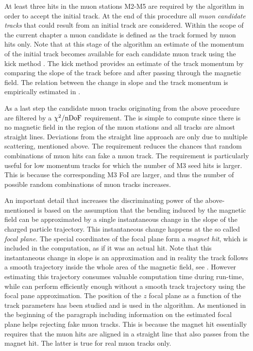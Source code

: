 At least three hits in the muon stations M2-M5 are required by the \mvm algorithm in order to accept the initial \velo track.
At the end of this procedure all {\it muon candidate tracks} that could result from an initial \velo track are considered.
Within the scope of the current chapter a muon candidate is defined as the track formed by muon hits only.
Note that at this stage of the algorithm an estimate of the momentum of the initial \velo track becomes available
for each candidate muon track using the kick method \cite{Hommels:999327}. The kick method provides an estimate
of the track momentum by comparing the slope of the track before and after passing through the \lhcb magnetic
field. The relation between the change in slope and the track momentum is empirically estimated in \cite{roelThesis}.

As a last step the candidate muon tracks originating from the above procedure are filtered by a $\chi^2/\rm nDoF$
requirement. The \chisq is simple to compute since there is no magnetic field in the region of the muon stations
and all tracks are almost straight lines. Deviations from the straight line approach are only due to
multiple scattering, mentioned above. The \chisq requirement reduces the chances that random combinations of muon hits
can fake a muon track. The requirement is particularly useful for low momentum tracks for which the number
of M3 seed hits is larger. This is because the corresponding M3 FoI are larger, and thus the number of possible
random combinations of muon tracks increases.

An important detail that increases the discriminating power of the above-mentioned \chisq is based on the
assumption that the bending induced by the \lhcb magnetic field can be approximated by a single instantaneous
change in the slope of the charged particle trajectory. This instantaneous change happens at the so called
{\it focal plane}. The special coordinates of the focal plane form a {\it magnet hit}, which is included in
the \chisq computation, as if it was an actual hit. Note that this instantaneous change in slope is an approximation
and in reality the track follows a smooth trajectory inside the whole area of the magnetic field, see .
However estimating this trajectory consumes valuable computation time during \hltone run-time, while \mvm can perform
efficiently enough without a smooth track trajectory using the focal
pane approximation. The position of the $z$ focal plane as a function of the track parameters has been studied
\cite{Hommels:999327} and is used in the \mvm algorithm. As mentioned in the beginning of the paragraph including
information on the estimated focal plane helps rejecting fake muon tracks.
This is because the magnet hit essentially requires that the muon hits are aligned in a straight line that
also passes from the magnet hit. The latter is true for real muon tracks only.

